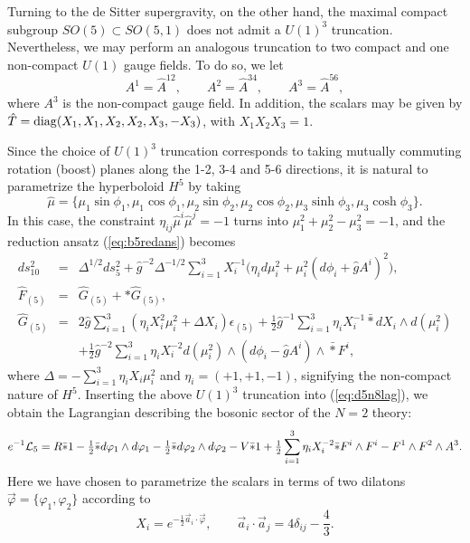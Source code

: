 \documentclass[a4paper,12pt]{article}
\newcommand{\fft}[2]{{\frac{#1}{#2}}}
\newcommand{\ft}[2]{{\textstyle\frac{#1}{#2}}}
\begin{document}
Turning to the de Sitter supergravity, on the other hand, the
maximal compact subgroup $SO(5)\subset SO(5,1)$ does not admit a $U(1)^3$
truncation.  Nevertheless, we may perform an analogous truncation to
two compact and one non-compact $U(1)$ gauge fields.  To do so, we let
%
\begin{equation}
A^1=\hat A^{12},\qquad
A^2=\hat A^{34},\qquad
A^3=\hat A^{56},
\end{equation}
%
where $A^3$ is the non-compact gauge field.  In addition, the
scalars may be given by $\hat T={\rm diag}(X_1,X_1,X_2,
X_2,X_3,-X_3)$, with $X_1X_2X_3=1$.

Since the choice of $U(1)^3$ truncation corresponds to taking mutually
commuting rotation (boost) planes along the 1-2, 3-4 and 5-6 directions,
it is natural to parametrize the hyperboloid $H^5$ by taking
%
\begin{equation}
\hat \mu=\{\mu_1\sin\phi_1,\mu_1\cos\phi_1,\mu_2\sin\phi_2,
\mu_2\cos\phi_2,\mu_3\sinh\phi_3,\mu_3\cosh\phi_3\}.
\end{equation}
%
In this case, the constraint $\eta_{ij}\hat\mu^i\hat\mu^j=-1$ turns into
$\mu_1^2+\mu_2^2-\mu_3^2=-1$, and the reduction ansatz
(\ref{eq:b5redans}) becomes
%
\begin{eqnarray}
ds_{10}^2&=&\Delta^{1/2}ds_5^2+\hat g^{-2}\Delta^{-1/2}\sum_{i=1}^3
X_i^{-1}\bigl(\eta_i d\mu_i^2+\mu_i^2(d\phi_i+\hat g A^i)^2),\nonumber\\
\hat F_{(5)}&=&\hat G_{(5)}+*\hat G_{(5)},\nonumber\\
\hat G_{(5)}&=&2\hat g\sum_{i=1}^3(\eta_iX_i^2\mu_i^2+\Delta
X_i)\epsilon_{(5)}+\fft12\hat g^{-1}\sum_{i=1}^3 \eta_i X_i^{-1}\bar *
dX_i\wedge d(\mu_i^2)\nonumber\\
&&+\fft12\hat g^{-2}\sum_{i=1}^3 \eta_iX_i^{-2}d(\mu_i^2)\wedge
(d\phi_i-\hat gA^i)\wedge\bar *F^i,
\end{eqnarray}
%
where $\Delta=-\sum_{i=1}^3\eta_iX_i\mu_i^2$ and $\eta_i=(+1,+1,-1)$,
signifying the non-compact nature of $H^5$.
Inserting the above $U(1)^3$ truncation into (\ref{eq:d5n8lag}), we
obtain the Lagrangian describing the bosonic sector of the
$N=2$ theory:
%
\begin{equation}
e^{-1}{\cal L}_5 = R\bar *1-\ft12\bar*d\varphi_1\wedge d\varphi_1
-\ft12\bar*d\varphi_2\wedge d\varphi_2-V\bar*1+\ft12\sum_{i=1}^3
\eta_iX_i^{-2}\bar*F^i\wedge F^i-F^1\wedge F^2\wedge A^3.
\label{eq:d5n2lag}
\end{equation}
%
Here we have chosen to parametrize the scalars in terms of two dilatons
$\vec\varphi=\{\varphi_1,\varphi_2\}$ according to
%
\begin{equation}
X_i=e^{-\fft12\vec a_i\cdot\vec\varphi},\qquad
\vec a_i\cdot\vec a_j=4\delta_{ij}-\ft43.
\end{equation}
%
\end{document}
